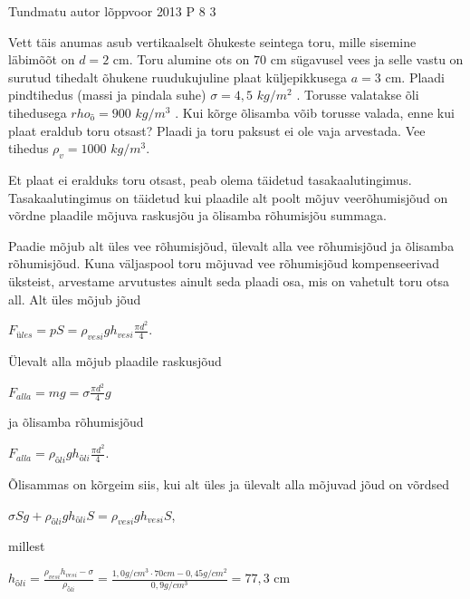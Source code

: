 {Tundmatu autor} %
{lõppvoor} %
{2013} %
{P 8} %
{3} %
{

\ifStatement
Vett täis anumas asub vertikaalselt õhukeste seintega toru, mille sisemine läbimõõt on $d = 2$ cm. Toru alumine ots on $70$ cm sügavusel vees ja selle vastu on surutud tihedalt õhukene ruudukujuline plaat küljepikkusega $a = 3$ cm. Plaadi pindtihedus (massi ja pindala suhe) $\sigma  = 4,5$ $kg/m^2$ . Torusse valatakse õli tihedusega $rho_õ = 900$ $kg/m^3$ . Kui kõrge õlisamba võib torusse valada, enne kui plaat eraldub toru otsast? Plaadi ja toru paksust ei ole vaja arvestada. Vee tihedus $\rho_v = 1000$ $kg/m^3$. 
\fi

\ifHint
Et plaat ei eralduks toru otsast, peab olema täidetud tasakaalutingimus. Tasakaalutingimus on täidetud kui plaadile alt poolt mõjuv veerõhumisjõud on võrdne plaadile mõjuva raskusjõu ja õlisamba rõhumisjõu summaga.
\fi

\ifSolution
Paadie mõjub alt üles vee rõhumisjõud, ülevalt alla vee rõhumisjõud ja õlisamba rõhumisjõud. Kuna väljaspool toru mõjuvad vee rõhumisjõud kompenseerivad üksteist, arvestame arvutustes ainult seda plaadi osa, mis on vahetult toru otsa all.
Alt üles mõjub jõud
\begin{center}
$F_{üles} = pS = \rho_{vesi}gh_{vesi}\frac{\pi d^2}{4}$.
\end{center}
Ülevalt alla mõjub plaadile raskusjõud
\begin{center}
$F_{alla} = mg = \sigma \frac{\pi d^2}{4}g$
\end{center}
ja õlisamba rõhumisjõud
\begin{center}
$F_{alla} = \rho_{õli}gh_{õli}\frac{\pi d^2}{4}$.
\end{center}
Õlisammas on kõrgeim siis, kui alt üles ja ülevalt alla mõjuvad jõud on võrdsed 
\begin{center}
$\sigma Sg + \rho_{õli}gh_{õli}S = \rho_{vesi} gh_{vesi}S$, 
\end{center}
millest
\begin{center}
$h_{õli} = \frac{\rho_{vesi} h_{vesi} - \sigma}{\rho_ {õli}} = \frac{1,0g/cm^3 \cdot 70 cm - 0,45 g/cm^2}{0,9 g/cm^3} = 77,3$ cm
\end{center}
\fi
}